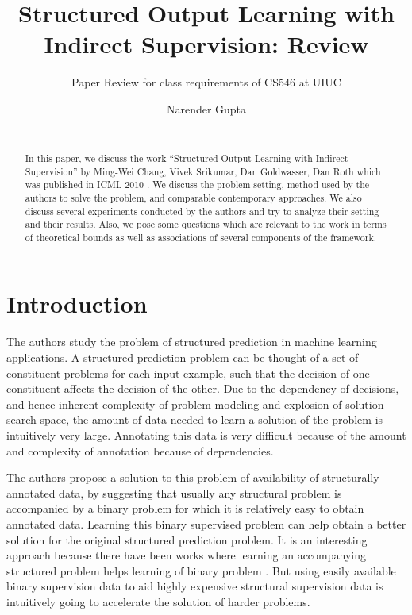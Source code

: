 \documentclass{acm_proc_article-sp}
\begin{document}
\title{Structured Output Learning with Indirect Supervision: Review}
\subtitle{Paper Review for class requirements of CS546 at UIUC}

\author{
\alignauthor
Narender Gupta\\
       \\
}



\maketitle
\begin{abstract}
In this paper, we discuss the work ``Structured Output Learning with Indirect Supervision'' by Ming-Wei Chang, Vivek Srikumar, Dan Goldwasser, Dan Roth which was published in ICML 2010 \cite{jlis}. We discuss the problem setting, method used by the authors to solve the problem, and comparable contemporary approaches. We also discuss several experiments conducted by the authors and try to analyze their setting and their results. Also, we pose some questions which are relevant to the work in terms of theoretical bounds as well as associations of several components of the framework.
\end{abstract}


\section{Introduction}
\label{sec:intro}
The authors study the problem of structured prediction in machine learning applications. A structured prediction problem can be thought of a set of constituent problems for each input example, such that the decision of one constituent affects the decision of the other. Due to the dependency of decisions, and hence inherent complexity of problem modeling and explosion of solution search space, the amount of data needed to learn a solution of the problem is intuitively very large. Annotating this data is very difficult because of the amount and complexity of annotation because of dependencies.

The authors propose a solution to this problem of availability of structurally annotated data, by suggesting that usually any structural problem is accompanied by a binary problem for which it is relatively easy to obtain annotated data. Learning this binary supervised problem can help obtain a better solution for the original structured prediction problem. It is an interesting approach because there have been works where learning an accompanying structured problem helps learning of binary problem \cite{Chang2009}. But using easily available binary supervision data to aid highly expensive structural supervision data is intuitively going to accelerate the solution of harder problems.\\\\
\end{document}
